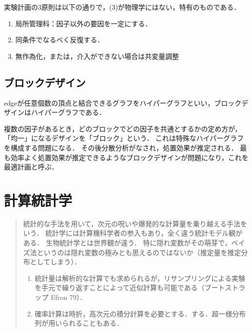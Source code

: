 \documentclass[uplatex,dvipdfmx]{jsreport}
\begin{document}
\begin{axiom}
    実験計画の3原則は以下の通りで，(3)が物理学にはない，特有のものである．
    \begin{enumerate}
        \item 局所管理科：因子以外の要因を一定にする．
        \item 同条件でなるべく反復する．
        \item 無作為化，または，介入ができない場合は共変量調整
    \end{enumerate}
\end{axiom}

\section{ブロックデザイン}

\begin{tcolorbox}[colframe=ForestGreen, colback=ForestGreen!10!white,breakable,colbacktitle=ForestGreen!40!white,coltitle=black,fonttitle=\bfseries\sffamily,
title=]
    edgeが任意個数の頂点と結合できるグラフをハイパーグラフといい，ブロックデザインはハイパーグラフである．
\end{tcolorbox}

複数の因子があるとき，どのブロックでどの因子を共通とするかの定め方が，「均一」になるデザインを「ブロック」という．
これは特殊なハイパーグラフを構成する問題になる．
その後分散分析がなされ，処置効果が推定される．
最も効率よく処置効果が推定できるようなブロックデザインが問題になり，これを最適計画と呼ぶ．

\chapter{計算統計学}

\begin{quotation}
    統計的な手法を用いて，次元の呪いや爆発的な計算量を乗り越える手法をいう．
    統計学には計算機科学者の参入もあり，全く違う統計モデル観がある．
    生物統計学とは世界観が違う．
    特に隠れ変数がその萌芽で，ベイズ法というのは隠れ変数の極みとも思えるのではないか（推定量を推定分布としてしまう）．
    \begin{enumerate}
        \item 統計量は解析的な計算でも求められるが，リサンプリングによる実験を手元で繰り返すことによって近似計算も可能である（ブートストラップ Efron 79）．
        \item 確率計算は時折，高次元の積分計算を必要とする．する．超一様分布列が用いられることもある．
    \end{enumerate}
\end{quotation}
\end{document}
